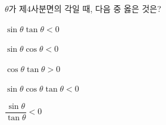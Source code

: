 $\theta$가 제$4$사분면의 각일 때, 다음 중 옳은 것은?
\begin{choicesii}{\rule[-3ex]{0pt}{8ex}$\sin\theta\tan\theta<0$}{\rule[-3ex]{0pt}{8ex}$\sin\theta\cos\theta<0$}{\rule[-3ex]{0pt}{8ex}$\cos\theta\tan\theta>0$}{\rule[-3ex]{0pt}{8ex}$\sin\theta\cos\theta\tan\theta<0$}{\rule[-3ex]{0pt}{8ex}$\dfrac{\sin\theta}{\tan\theta}<0$}\end{choicesii}
